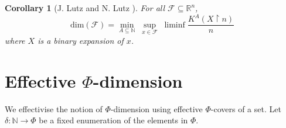 \documentclass[11pt]{article}
\newtheorem{corollary}{Corollary}
\newcommand{\restr}{\upharpoonright}
\newcommand{\N}{\mathbb{N}}
\newcommand{\R}{\mathbb{R}}
\newcommand{\cdim}{\mathrm{cdim}}
\renewcommand{\dim}{{\mathrm{dim}}}
\newcommand{\X}{{\mathbb{X}}}
\newcommand{\x}{x}
\begin{document}
\begin{corollary}[J. Lutz and N. Lutz  \cite{Lutz2018}]\label{thm:PSP}
	For all $\mathcal{F} \subseteq \R^n$, $$\dim(\mathcal{F}) =
	\min\limits_{A \subseteq \N} \; \sup\limits_{\x \in
		\mathcal{F}} \; \liminf\frac{K^A(X \restr n)}{n}$$
	where $X$ is a binary expansion of $x$.
\end{corollary}

%
%
%
%




\section{Effective $\Phi$-dimension} \label{sec:EffPhi}

We effectivise the notion of $\Phi$-dimension using effective $\Phi$-covers of a set. Let $\delta : \N \to \Phi$ be a fixed enumeration of the elements in $\Phi$.
\end{document}
